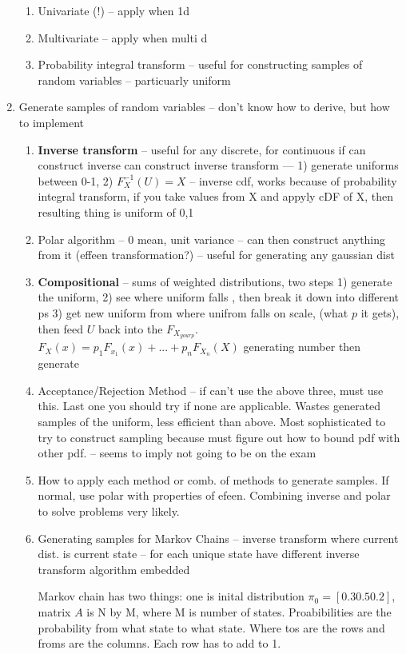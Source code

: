 \documentclass{report}
\begin{document}
\begin{enumerate}
  \begin{enumerate}
 \item Univariate (!) -- apply when 1d
 \item Multivariate  -- apply when multi d
 \item Probability integral transform -- useful for constructing samples of random variables -- particuarly uniform
 \end{enumerate}
 \item Generate samples of random variables -- don't know how to derive, but how to implement
  \begin{enumerate}
 \item \textbf{Inverse transform} -- useful for any discrete, for continuous if can construct inverse can construct inverse transform --- 1) generate uniforms between 0-1, 2) $F_X^{-1}(U)=X$ -- inverse cdf, works because of probability integral transform, if you take values from X and appyly cDF of X, then resulting thing is uniform of 0,1
 \item Polar algorithm -- 0 mean, unit variance -- can then construct anything from it (effeen transformation?) -- useful for generating any gaussian dist
 \item \textbf{Compositional} -- sums of weighted distributions, two steps 1) generate the uniform, 2) see where uniform falls , then break it down into different ps 3) get new uniform from where unifrom falls on scale, (what $p$ it gets), then feed $U$ back into the $F_{X_{your p}}$. $F_X(x) = p_1 F_{x_1}(x) + ... + p_n F_{X_n}(X)$ generating number then generate 
 \item Acceptance/Rejection Method -- if can't use the above three, must use this. Last one you should try if none are applicable. Wastes generated samples of the uniform, less efficient than above. Most sophisticated to try to construct sampling because must figure out how to bound pdf with other pdf. -- seems to imply not going to be on the exam
 \item How to apply each method or comb. of methods to generate samples. If normal, use polar with properties of efeen. Combining inverse and polar to solve problems very likely.
 \item Generating samples for Markov Chains -- inverse transform where current dist. is current state -- for each unique state have different inverse transform algorithm embedded 
 
Markov chain has two things: one is inital distribution $\pi_0 = [0.3 0.5 0.2]$, matrix $A$ is N by M, where M is number of states. Proabibilities are the probability from what state to what state. Where tos are the rows and froms are the columns. Each row has to add to 1. 



\end{enumerate}
\end{enumerate}
\end{document}
